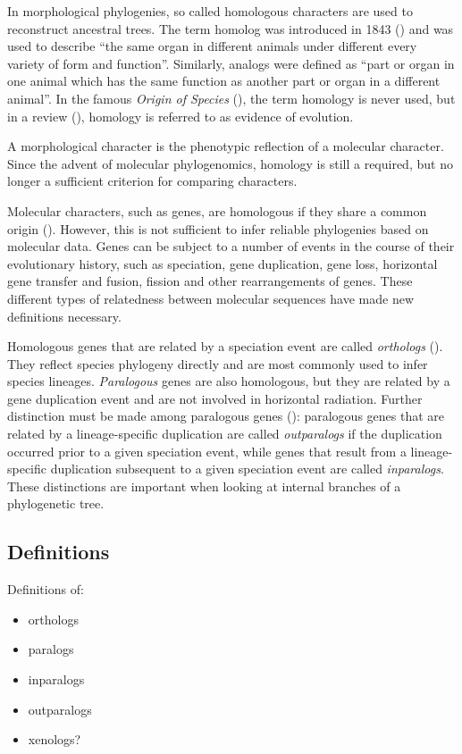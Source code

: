 In morphological phylogenies, so called homologous characters are used to
reconstruct ancestral trees. The term homolog was introduced in 1843
(\cite{owen1848}) and was used to describe ``the same organ in different animals
under different every variety of form and function''. Similarly, analogs were
defined as ``part or organ in one animal which has the same function as another
part or organ in a different animal''. In the famous \emph{Origin of Species}
(\cite{darwin1859}), the term homology is never used, but in a review
(\cite{owen1860}), homology is referred to as evidence of evolution.

A morphological character is the phenotypic reflection of a molecular character.
Since the advent of molecular phylogenomics, homology is still a required, but
no longer a sufficient criterion for comparing characters.

Molecular characters, such as genes, are homologous if they share a common
origin (\cite{koonin2005}). However, this is not sufficient to infer reliable
phylogenies based on molecular data. Genes can be subject to a number of events
in the course of their evolutionary history, such as speciation, gene
duplication, gene loss, horizontal gene transfer and fusion, fission and other
rearrangements of genes. These different types of relatedness between molecular
sequences have made new definitions necessary.

Homologous genes that are related by a speciation event are called
\emph{orthologs} (\cite{fitch1970}). They reflect species phylogeny directly and
are most commonly used to infer species lineages. \emph{Paralogous} genes are
also homologous, but they are related by a gene duplication event and are not
involved in horizontal radiation. Further distinction must be made among
paralogous genes (\cite{sonnhammer2002}): paralogous genes that are related by a
lineage-specific duplication are called \emph{outparalogs} if the duplication
occurred prior to a given speciation event, while genes that result from a
lineage-specific duplication subsequent to a given speciation event are called
\emph{inparalogs}.  These distinctions are important when looking at internal
branches of a phylogenetic tree.


\subsection{Definitions}

Definitions of:
\begin{itemize}
	\item orthologs
	\item paralogs
	\item inparalogs
	\item outparalogs
	\item xenologs?
\end{itemize}

